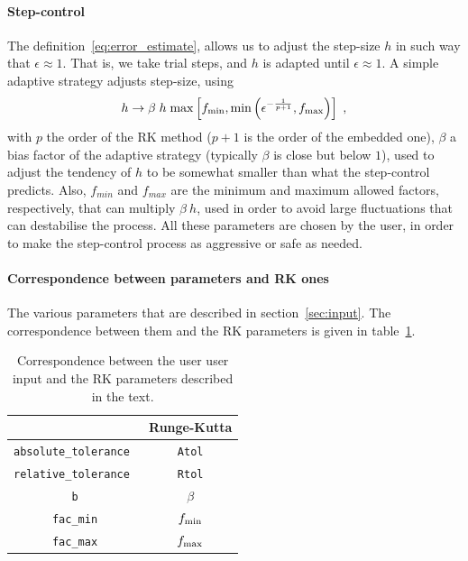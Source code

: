 \documentclass[11pt,a4paper]{article}
\begin{document}
\paragraph{Step-control} The definition~\ref{eq:error_estimate}, allows us to adjust the step-size $h$ in such way that $\epsilon \approx 1$. That is, we take trial steps, and $h$ is adapted until $\epsilon \approx 1$.  A simple adaptive strategy adjusts step-size, using
%
\begin{eqnarray}
	h \to \beta \; h \;  {\rm max} \left[ f_{\rm min}, {\rm min} \left( \epsilon^{-\frac{1}{p+1}}, f_{\rm max} \right) \right] \;,
	\label{eq:step-control}
\end{eqnarray}
%
with $p$ the order of the RK method ($p+1$ is the order of the embedded one), $\beta$  a bias factor of the adaptive strategy (typically $\beta$ is close but below $1$), used to adjust the tendency of $h$ to be somewhat smaller than what the step-control predicts. Also, $f_{min}$ and $f_{max}$ are the minimum and maximum allowed factors, respectively, that can multiply $\beta \ h$, used in order to avoid large fluctuations that can destabilise the process. All these parameters are chosen by the user, in order to make the step-control process as aggressive or safe as needed. 

\paragraph{Correspondence between \mimes parameters and RK ones}
%
The various parameters that \mimes are described in section~\ref{sec:input}. The correspondence between them and the RK parameters is given in table~\ref{tab:RK_mimes_params}.
%
\begin{table}[t!]
	\centering
	\begin{tabular}{|c|c|}
		\mimes & Runge-Kutta \\
		\hline
		{\tt absolute\_tolerance } & {\tt Atol}  \\
		\hline
		{\tt relative\_tolerance } & {\tt Rtol}  \\
		\hline
		{\tt b} & $\beta$  \\
		\hline
		{\tt fac\_min} & $f_{\rm min}$  \\
		\hline
		{\tt fac\_max} & $f_{\rm max}$  \\
		\hline
	\end{tabular}
	\caption{Correspondence between the user \mimes user input and the RK parameters described in the text.}
	\label{tab:RK_mimes_params}
\end{table}
\end{document}
